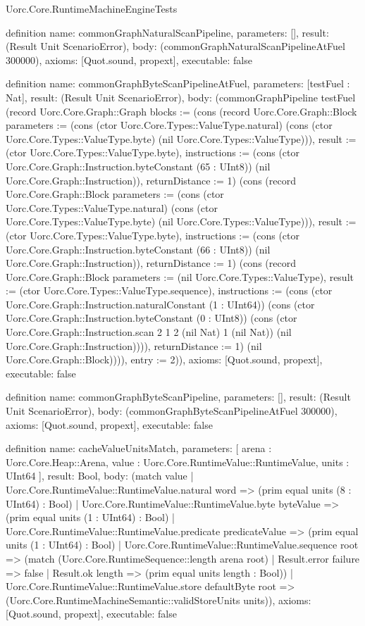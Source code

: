 \begin{lexlean}{Uorc.Core.RuntimeMachineEngineTests}
\begin{semanticmodule}
definition{
  name: commonGraphNaturalScanPipeline,
  parameters: [],
  result: (Result Unit ScenarioError),
  body: (commonGraphNaturalScanPipelineAtFuel 300000),
  axioms: [Quot.sound, propext],
  executable: false
}

definition{
  name: commonGraphByteScanPipelineAtFuel,
  parameters: [testFuel : Nat],
  result: (Result Unit ScenarioError),
  body: (commonGraphPipeline testFuel (record Uorc.Core.Graph::Graph {blocks := (cons (record Uorc.Core.Graph::Block {parameters := (cons (ctor Uorc.Core.Types::ValueType.natural) (cons (ctor Uorc.Core.Types::ValueType.byte) (nil Uorc.Core.Types::ValueType))), result := (ctor Uorc.Core.Types::ValueType.byte), instructions := (cons (ctor Uorc.Core.Graph::Instruction.byteConstant (65 : UInt8)) (nil Uorc.Core.Graph::Instruction)), returnDistance := 1}) (cons (record Uorc.Core.Graph::Block {parameters := (cons (ctor Uorc.Core.Types::ValueType.natural) (cons (ctor Uorc.Core.Types::ValueType.byte) (nil Uorc.Core.Types::ValueType))), result := (ctor Uorc.Core.Types::ValueType.byte), instructions := (cons (ctor Uorc.Core.Graph::Instruction.byteConstant (66 : UInt8)) (nil Uorc.Core.Graph::Instruction)), returnDistance := 1}) (cons (record Uorc.Core.Graph::Block {parameters := (nil Uorc.Core.Types::ValueType), result := (ctor Uorc.Core.Types::ValueType.sequence), instructions := (cons (ctor Uorc.Core.Graph::Instruction.naturalConstant (1 : UInt64)) (cons (ctor Uorc.Core.Graph::Instruction.byteConstant (0 : UInt8)) (cons (ctor Uorc.Core.Graph::Instruction.scan 2 1 2 (nil Nat) 1 (nil Nat)) (nil Uorc.Core.Graph::Instruction)))), returnDistance := 1}) (nil Uorc.Core.Graph::Block)))), entry := 2})),
  axioms: [Quot.sound, propext],
  executable: false
}

definition{
  name: commonGraphByteScanPipeline,
  parameters: [],
  result: (Result Unit ScenarioError),
  body: (commonGraphByteScanPipelineAtFuel 300000),
  axioms: [Quot.sound, propext],
  executable: false
}

definition{
  name: cacheValueUnitsMatch,
  parameters: [
    arena : Uorc.Core.Heap::Arena,
    value : Uorc.Core.RuntimeValue::RuntimeValue,
    units : UInt64
  ],
  result: Bool,
  body: (match value
    | Uorc.Core.RuntimeValue::RuntimeValue.natural word => (prim equal units (8 : UInt64) : Bool)
    | Uorc.Core.RuntimeValue::RuntimeValue.byte byteValue => (prim equal units (1 : UInt64) : Bool)
    | Uorc.Core.RuntimeValue::RuntimeValue.predicate predicateValue => (prim equal units (1 : UInt64) : Bool)
    | Uorc.Core.RuntimeValue::RuntimeValue.sequence root => (match (Uorc.Core.RuntimeSequence::length arena root)
      | Result.error failure => false
      | Result.ok length => (prim equal units length : Bool))
    | Uorc.Core.RuntimeValue::RuntimeValue.store defaultByte root => (Uorc.Core.RuntimeMachineSemantic::validStoreUnits units)),
  axioms: [Quot.sound, propext],
  executable: false
}


\end{semanticmodule}
\end{lexlean}
